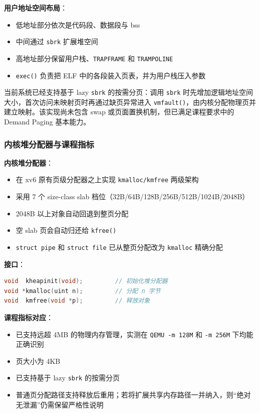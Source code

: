 \documentclass[12pt,a4paper]{ctexart}
\begin{document}
\textbf{用户地址空间布局}：
\begin{itemize}
  \item 低地址部分依次是代码段、数据段与 bss
  \item 中间通过 \texttt{sbrk} 扩展堆空间
  \item 高地址部分保留用户栈、\texttt{TRAPFRAME} 和 \texttt{TRAMPOLINE}
  \item \texttt{exec()} 负责把 ELF 中的各段装入页表，并为用户栈压入参数
\end{itemize}

当前系统已经支持基于 lazy \texttt{sbrk} 的按需分页：调用 \texttt{sbrk} 时先增加逻辑地址空间大小，首次访问未映射页时再通过缺页异常进入 \texttt{vmfault()}，由内核分配物理页并建立映射。该实现尚未包含 swap 或页面置换机制，但已满足课程要求中的 Demand Paging 基本能力。

\subsubsection{内核堆分配器与课程指标}

\textbf{内核堆分配器}：
\begin{itemize}
  \item 在 xv6 原有页级分配器之上实现 \texttt{kmalloc/kmfree} 两级架构
  \item 采用 7 个 size-class slab 档位（32B/64B/128B/256B/512B/1024B/2048B）
  \item 2048B 以上对象自动回退到整页分配
  \item 空 slab 页会自动归还给 \texttt{kfree()}
  \item \texttt{struct pipe} 和 \texttt{struct file} 已从整页分配改为 \texttt{kmalloc} 精确分配
\end{itemize}

\textbf{接口}：
\begin{lstlisting}[language=C]
void  kheapinit(void);         // 初始化堆分配器
void *kmalloc(uint n);         // 分配 n 字节
void  kmfree(void *p);         // 释放对象
\end{lstlisting}

\textbf{课程指标对应}：
\begin{itemize}
  \item 已支持远超 4MB 的物理内存管理，实测在 \texttt{QEMU -m 128M} 和 \texttt{-m 256M} 下均能正确识别
  \item 页大小为 4KB
  \item 已支持基于 lazy \texttt{sbrk} 的按需分页
  \item 普通页分配路径支持释放后重用；若将扩展共享内存路径一并纳入，则“绝对无泄漏”仍需保留严格性说明
\end{itemize}
\end{document}
